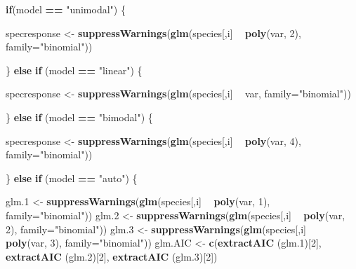 \documentclass[]{article}
\newenvironment{Shaded}{\begin{snugshade}}{\end{snugshade}}
\newcommand{\ControlFlowTok}[1]{\textcolor[rgb]{0.13,0.29,0.53}{\textbf{#1}}}
\newcommand{\DataTypeTok}[1]{\textcolor[rgb]{0.13,0.29,0.53}{#1}}
\newcommand{\DecValTok}[1]{\textcolor[rgb]{0.00,0.00,0.81}{#1}}
\newcommand{\FloatTok}[1]{\textcolor[rgb]{0.00,0.00,0.81}{#1}}
\newcommand{\KeywordTok}[1]{\textcolor[rgb]{0.13,0.29,0.53}{\textbf{#1}}}
\newcommand{\NormalTok}[1]{#1}
\newcommand{\OperatorTok}[1]{\textcolor[rgb]{0.81,0.36,0.00}{\textbf{#1}}}
\newcommand{\StringTok}[1]{\textcolor[rgb]{0.31,0.60,0.02}{#1}}
\begin{document}
\begin{Shaded}
\begin{Highlighting}[]
      \ControlFlowTok{if}\NormalTok{(model }\OperatorTok{==}\StringTok{ "unimodal"}\NormalTok{) \{}
        
\NormalTok{        specresponse <-}\StringTok{ }\KeywordTok{suppressWarnings}\NormalTok{(}\KeywordTok{glm}\NormalTok{(species[,i] }\OperatorTok{~}\StringTok{ }\KeywordTok{poly}\NormalTok{(var, }\DecValTok{2}\NormalTok{),}
                                             \DataTypeTok{family=}\StringTok{"binomial"}\NormalTok{))}
        
\NormalTok{      \} }\ControlFlowTok{else} \ControlFlowTok{if}\NormalTok{ (model }\OperatorTok{==}\StringTok{ "linear"}\NormalTok{) \{}
        
\NormalTok{        specresponse <-}\StringTok{ }\KeywordTok{suppressWarnings}\NormalTok{(}\KeywordTok{glm}\NormalTok{(species[,i] }\OperatorTok{~}\StringTok{ }\NormalTok{var,}
                                             \DataTypeTok{family=}\StringTok{"binomial"}\NormalTok{))}
        
\NormalTok{      \} }\ControlFlowTok{else} \ControlFlowTok{if}\NormalTok{ (model }\OperatorTok{==}\StringTok{ "bimodal"}\NormalTok{) \{}
        
\NormalTok{        specresponse <-}\StringTok{ }\KeywordTok{suppressWarnings}\NormalTok{(}\KeywordTok{glm}\NormalTok{(species[,i] }\OperatorTok{~}\StringTok{ }\KeywordTok{poly}\NormalTok{(var, }\DecValTok{4}\NormalTok{),}
                                             \DataTypeTok{family=}\StringTok{"binomial"}\NormalTok{))}
        
\NormalTok{      \}}
      \ControlFlowTok{else} \ControlFlowTok{if}\NormalTok{ (model }\OperatorTok{==}\StringTok{ "auto"}\NormalTok{) \{}
        
\NormalTok{        glm}\FloatTok{.1}\NormalTok{ <-}\StringTok{ }\KeywordTok{suppressWarnings}\NormalTok{(}\KeywordTok{glm}\NormalTok{(species[,i] }\OperatorTok{~}\StringTok{ }\KeywordTok{poly}\NormalTok{(var, }\DecValTok{1}\NormalTok{), }\DataTypeTok{family=}\StringTok{"binomial"}\NormalTok{))}
\NormalTok{        glm}\FloatTok{.2}\NormalTok{ <-}\StringTok{ }\KeywordTok{suppressWarnings}\NormalTok{(}\KeywordTok{glm}\NormalTok{(species[,i] }\OperatorTok{~}\StringTok{ }\KeywordTok{poly}\NormalTok{(var, }\DecValTok{2}\NormalTok{), }\DataTypeTok{family=}\StringTok{"binomial"}\NormalTok{))}
\NormalTok{        glm}\FloatTok{.3}\NormalTok{ <-}\StringTok{ }\KeywordTok{suppressWarnings}\NormalTok{(}\KeywordTok{glm}\NormalTok{(species[,i] }\OperatorTok{~}\StringTok{ }\KeywordTok{poly}\NormalTok{(var, }\DecValTok{3}\NormalTok{), }\DataTypeTok{family=}\StringTok{"binomial"}\NormalTok{))}
\NormalTok{        glm.AIC <-}\StringTok{ }\KeywordTok{c}\NormalTok{(}\KeywordTok{extractAIC}\NormalTok{ (glm}\FloatTok{.1}\NormalTok{)[}\DecValTok{2}\NormalTok{], }\KeywordTok{extractAIC}\NormalTok{ (glm}\FloatTok{.2}\NormalTok{)[}\DecValTok{2}\NormalTok{],}
                     \KeywordTok{extractAIC}\NormalTok{ (glm}\FloatTok{.3}\NormalTok{)[}\DecValTok{2}\NormalTok{])}
        

\end{Highlighting}
\end{Shaded}
\end{document}
